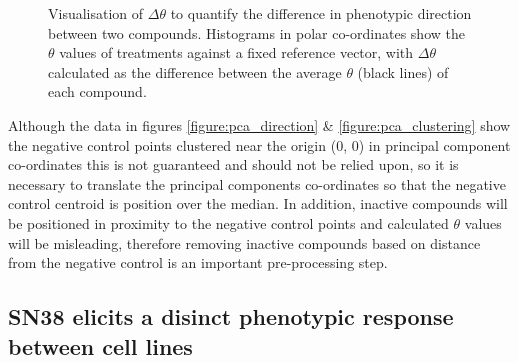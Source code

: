 \documentclass[a4paper,11pt,twoside,openright]{scrbook}
\begin{document}
\begin{figure}
    \captionsetup{width=0.8\textwidth}
    \caption[Visualisation of $\Delta\theta$ to quantify the difference in phenotypic direction between two compounds.]{
Visualisation of $\Delta\theta$ to quantify the difference in phenotypic direction between two compounds.
Histograms in polar co-ordinates show the $\theta$ values of treatments against a fixed reference vector, with $\Delta\theta$ calculated as the difference between the average $\theta$ (black lines) of each compound.
}
    
    \label{figure:theta_histogram}
\end{figure}

Although the data in figures \ref{figure:pca_direction} \& \ref{figure:pca_clustering} show the negative control points clustered near the origin (0, 0) in principal component co-ordinates this is not guaranteed and should not be relied upon, so it is necessary to translate the principal components co-ordinates so that the negative control centroid is position over the median.
In addition, inactive compounds will be positioned in proximity to the negative control points and calculated $\theta$ values will be misleading, therefore removing inactive compounds based on distance from the negative control is an important pre-processing step.


\subsection{SN38 elicits a disinct phenotypic response between cell lines}
\end{document}
